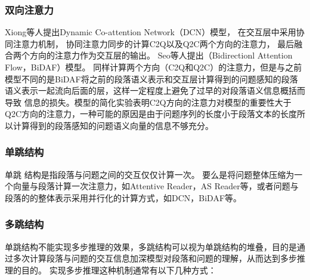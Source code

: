 \subsubsection{双向注意力}
Xiong等人提出Dynamic Co-attention Network（DCN）模型，
在交互层中采用协同注意力机制，
协同注意力同步的计算C2Q以及Q2C两个方向的注意力，
最后融合两个方向的注意力作为交互层的输出。
Seo等人提出（Bidirectionl Attention Flow，BiDAF）模型。
同样计算两个方向（C2Q和Q2C）的注意力，但是与之前模型不同的是BiDAF将之前的段落语义表示和交互层计算得到的问题感知的段落语义表示一起流向后面的层，这样一定程度上避免了过早的对段落语义信息概括而导致
信息的损失。模型的简化实验表明C2Q方向的注意力对模型的重要性大于Q2C方向的注意力，一种可能的原因是由于问题序列的长度小于段落文本的长度所以计算得到的段落感知的问题语义向量的信息不够充分。
%
\subsubsection{单跳结构}
单跳
结构是指段落与问题之间的交互仅仅计算一次。
要么是将问题整体压缩为一个向量与段落计算一次注意力，如Attentive Reader，AS Reader等，或者问题与段落的的整体表示采用并行化的计算方式，如DCN，BiDAF等。
%
\subsubsection{多跳结构}
单跳结构不能实现多步推理的效果，多跳结构可以视为单跳结构的堆叠，目的是通过多次计算段落与问题的交互信息加深模型对段落和问题的理解，从而达到多步推理的目的。
实现多步推理这种机制通常有以下几种方式：
%

